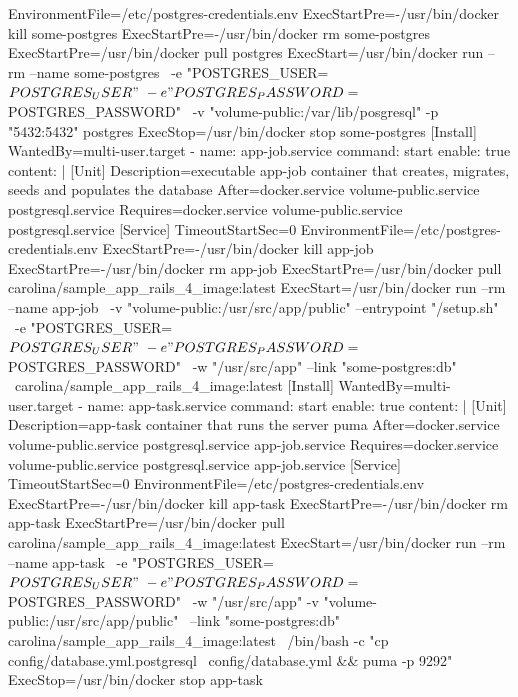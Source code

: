 \begin{codelisting}
\begin{code}
      EnvironmentFile=/etc/postgres-credentials.env
      ExecStartPre=-/usr/bin/docker kill some-postgres 
      ExecStartPre=-/usr/bin/docker rm some-postgres 
      ExecStartPre=/usr/bin/docker pull postgres 
      ExecStart=/usr/bin/docker run --rm --name some-postgres \
      -e "POSTGRES_USER=${POSTGRES_USER}" \
      -e "POSTGRES_PASSWORD=${POSTGRES_PASSWORD}" \
      -v "volume-public:/var/lib/posgresql" -p "5432:5432" postgres 
      ExecStop=/usr/bin/docker stop some-postgres
      [Install] 
      WantedBy=multi-user.target
  - name: app-job.service
    command: start
    enable: true
    content: |
      [Unit] 
      Description=executable app-job container that creates, migrates, seeds
                  and populates the database
      After=docker.service volume-public.service postgresql.service
      Requires=docker.service volume-public.service postgresql.service
      [Service] 
      TimeoutStartSec=0 
      EnvironmentFile=/etc/postgres-credentials.env
      ExecStartPre=-/usr/bin/docker kill app-job 
      ExecStartPre=-/usr/bin/docker rm app-job 
      ExecStartPre=/usr/bin/docker pull carolina/sample_app_rails_4_image:latest 
      ExecStart=/usr/bin/docker run --rm --name app-job \
                -v "volume-public:/usr/src/app/public" --entrypoint "/setup.sh" \
      -e "POSTGRES_USER=${POSTGRES_USER}" \
      -e "POSTGRES_PASSWORD=${POSTGRES_PASSWORD}" \
      -w "/usr/src/app" --link "some-postgres:db" \
      carolina/sample_app_rails_4_image:latest
      [Install] 
      WantedBy=multi-user.target
  - name: app-task.service
    command: start
    enable: true
    content: |
      [Unit] 
      Description=app-task container that runs the server puma
      After=docker.service volume-public.service postgresql.service 
            app-job.service
      Requires=docker.service volume-public.service postgresql.service 
               app-job.service
      [Service] 
      TimeoutStartSec=0 
      EnvironmentFile=/etc/postgres-credentials.env
      ExecStartPre=-/usr/bin/docker kill app-task 
      ExecStartPre=-/usr/bin/docker rm app-task
      ExecStartPre=/usr/bin/docker pull carolina/sample_app_rails_4_image:latest 
      ExecStart=/usr/bin/docker run --rm --name app-task \
      -e "POSTGRES_USER=${POSTGRES_USER}" \
      -e "POSTGRES_PASSWORD=${POSTGRES_PASSWORD}" \
      -w "/usr/src/app" -v "volume-public:/usr/src/app/public" \
      --link "some-postgres:db" carolina/sample_app_rails_4_image:latest \
      /bin/bash -c "cp config/database.yml.postgresql \
      config/database.yml && puma -p 9292"
      ExecStop=/usr/bin/docker stop app-task

\end{code}
\end{codelisting}
